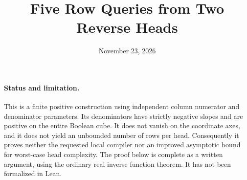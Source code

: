 \documentclass[11pt]{article}
\title{Five Row Queries from Two Reverse Heads}
\author{}
\date{November 23, 2026}
\begin{document}
\maketitle

\paragraph{Status and limitation.}
This is a finite positive construction using independent column numerator
and denominator parameters. Its denominators have strictly negative
slopes and are positive on the entire Boolean cube. It does not vanish
on the coordinate axes, and it does not yield an unbounded number of
rows per head. Consequently it proves neither the requested local
compiler nor an improved asymptotic bound for worst-case head complexity.
The proof below is complete as a written argument, using the ordinary
real inverse function theorem. It has not been formalized in Lean.
\end{document}
